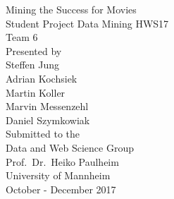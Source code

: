 \documentclass[11pt,titlepage,oneside,openany]{book}
\begin{document}
\begin{titlepage}
	\vspace*{2cm}
  \begin{center}
   {\huge Mining the Success for Movies \\}
   \vspace{2cm} 
   {\Large Student Project Data Mining HWS17\\
   Team 6\\}
   \vspace{2cm}
   {\Large Presented by \\}
   \vspace{0.5cm}
    {Steffen Jung \\
    Adrian Kochsiek \\
    Martin Koller \\
    Marvin Messenzehl \\
    Daniel Szymkowiak \\
   }
   \vspace{1cm} 
   { Submitted to the\\
    Data and Web Science Group\\
    Prof.\ Dr.\ Heiko Paulheim\\
    University of Mannheim\\} \vspace{2cm}
   {October - December 2017}
  \end{center}
\end{titlepage} 

\tableofcontents
\newpage





\newpage










%
\end{document}
